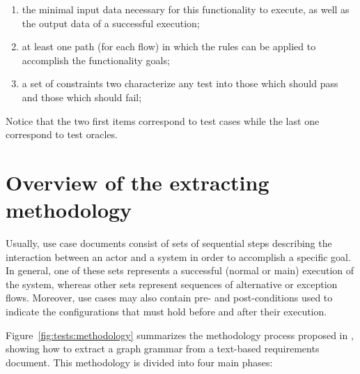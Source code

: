 \begin{enumerate}
\item the minimal input data necessary for this functionality to execute, as well as the output data of a successful execution;

\item at least one path (for each flow) in which the rules can be applied to accomplish the functionality goals;

\item a set of constraints two characterize any test into those which should pass and those which should fail;

\end{enumerate}

Notice that the two first items correspond to test cases while the last one correspond to test oracles.


\section{Overview of the extracting methodology}

Usually, use case documents consist of sets of sequential steps describing the interaction between an actor and a system in order to accomplish a specific goal. In general, one of these sets represents a successful (normal or main) execution of the system, whereas other sets represent sequences of alternative or exception flows. Moreover, use cases may also contain pre- and post-conditions used to indicate the configurations that must hold before and after their execution.

Figure~\ref{fig:tests:methodology} summarizes the methodology process proposed in \cite{Junior2015}, showing how to extract a graph grammar from a text-based requirements document. This methodology is divided into four main phases:


